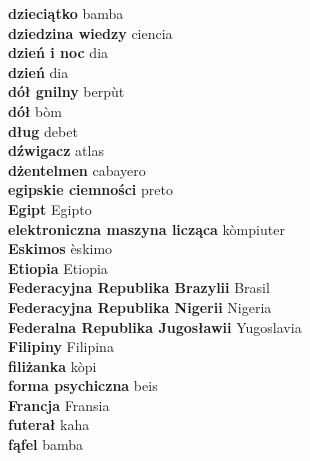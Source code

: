 \textbf{ dzieciątko  } bamba \\
\textbf{ dziedzina wiedzy  } ciencia \\
\textbf{ dzień i noc  } dia \\
\textbf{ dzień  } dia \\
\textbf{ dół gnilny  } berpùt \\
\textbf{ dół  } bòm \\
\textbf{ dług  } debet \\
\textbf{ dźwigacz  } atlas \\
\textbf{ dżentelmen  } cabayero \\
\textbf{ egipskie ciemności  } preto \\
\textbf{ Egipt  } Egipto \\
\textbf{ elektroniczna maszyna licząca  } kòmpiuter \\
\textbf{ Eskimos  } èskimo \\
\textbf{ Etiopia  } Etiopia \\
\textbf{ Federacyjna Republika Brazylii  } Brasil \\
\textbf{ Federacyjna Republika Nigerii  } Nigeria \\
\textbf{ Federalna Republika Jugosławii  } Yugoslavia \\
\textbf{ Filipiny  } Filipina \\
\textbf{ filiżanka  } kòpi \\
\textbf{ forma psychiczna  } beis \\
\textbf{ Francja  } Fransia \\
\textbf{ futerał  } kaha \\
\textbf{ fąfel  } bamba \\
